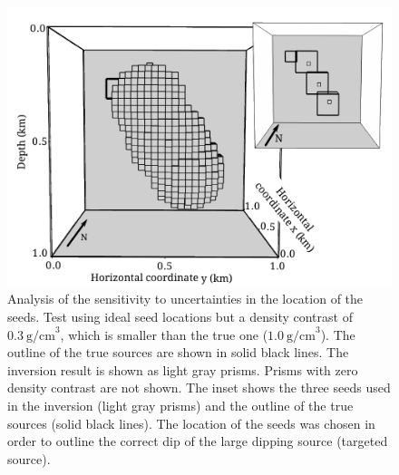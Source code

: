 \documentclass[twocolumn]{article}
\begin{document}
\begin{figure}[]
    \includegraphics{fig/sensitivity-under}
    \caption{     
    Analysis of the sensitivity to uncertainties in the location of the seeds.
    Test using ideal seed locations
    but a density contrast of $0.3\ \mathrm{g/cm}^3$,
    which is smaller than the true one ($1.0\ \mathrm{g/cm}^3$).
    The outline of the true sources are shown in solid black lines.
    The inversion result is shown as light gray prisms.
    Prisms with zero density contrast are not shown.
    The inset shows the three seeds used in the inversion (light gray prisms)
    and the outline of the true sources (solid black lines).
    The location of the seeds was chosen
    in order to outline the correct dip of
    the large dipping source (targeted source).
    \label{fig:sensanal-under}}
\end{figure}
\end{document}
